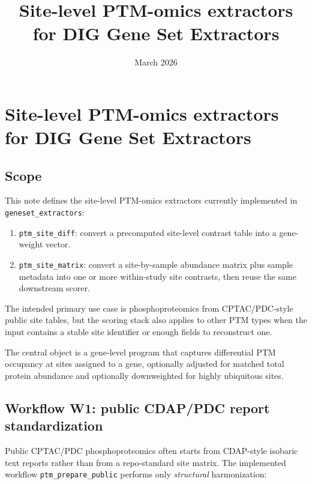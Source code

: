 \documentclass[11pt]{article}
\title{Site-level PTM-omics extractors for DIG Gene Set Extractors}
\author{}
\date{March 2026}
\begin{document}
\maketitle

\section{Site-level PTM-omics extractors for DIG Gene Set Extractors}
\label{sec:ptm_site_level}

\subsection{Scope}
This note defines the site-level PTM-omics extractors currently implemented in
\texttt{geneset\_extractors}:

\begin{enumerate}
\item \texttt{ptm\_site\_diff}: convert a precomputed site-level contrast table
into a gene-weight vector.
\item \texttt{ptm\_site\_matrix}: convert a site-by-sample abundance matrix plus
sample metadata into one or more within-study site contrasts, then reuse the
same downstream scorer.
\end{enumerate}

The intended primary use case is phosphoproteomics from CPTAC/PDC-style public
site tables, but the scoring stack also applies to other PTM types when the
input contains a stable site identifier or enough fields to reconstruct one.

The central object is a gene-level program that captures differential PTM
occupancy at sites assigned to a gene, optionally adjusted for matched total
protein abundance and optionally downweighted for highly ubiquitous sites.

\subsection{Workflow W1: public CDAP/PDC report standardization}
\label{sec:ptm_public_prepare}

Public CPTAC/PDC phosphoproteomics often starts from CDAP-style isobaric text
reports rather than from a repo-standard site matrix. The implemented workflow
\texttt{ptm\_prepare\_public} performs only \emph{structural} harmonization:
\end{document}
